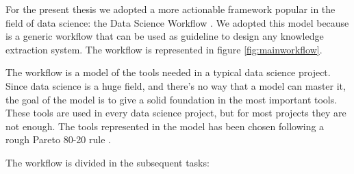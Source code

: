 \documentclass[b5paper,]{book}
\theoremstyle{definition}
\theoremstyle{definition}
\theoremstyle{definition}
\theoremstyle{remark}
\begin{document}
For the present thesis we adopted a more actionable framework popular in
the field of data science: the Data Science Workflow
\citep{wickham2016r}. We adopted this model because is a generic
workflow that can be used as guideline to design any knowledge
extraction system. The workflow is represented in figure
\ref{fig:mainworkflow}.

The workflow is a model of the tools needed in a typical data science
project. Since data science is a huge field, and there's no way that a
model can master it, the goal of the model is to give a solid foundation
in the most important tools. These tools are used in every data science
project, but for most projects they are not enough. The tools
represented in the model has been chosen following a rough Pareto 80-20
rule \citep{pareto1971manual}.

The workflow is divided in the subsequent tasks:
\end{document}

